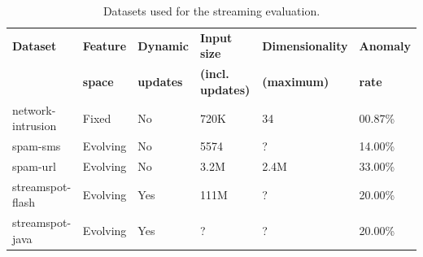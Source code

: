 \documentclass[11pt,onecolumn]{article}
\begin{document}
\begin{table}[ht!]
	\centering
	\begin{tabular}{llllll}
	\toprule
	\textbf{Dataset} & \textbf{Feature} & \textbf{Dynamic} & \textbf{Input size} 		  & \textbf{Dimensionality} & \textbf{Anomaly}\\
									 & \textbf{space}   & \textbf{updates} & \textbf{(incl. updates)} & \textbf{(maximum)} 			& \textbf{rate}\\
	\midrule
	network-intrusion& Fixed 	  		    & No				 & 720K    & 34   & 00.87\%\\
 	spam-sms 			 	 & Evolving 			  & No				 & 5574 	 & ? 	 & 14.00\%\\
 	spam-url 			 	 & Evolving 				& No				 & 3.2M    & 2.4M & 33.00\%\\
	streamspot-flash & Evolving 				& Yes				 & 111M    & ?    & 20.00\%\\
	streamspot-java  & Evolving 				& Yes				 & ?       & ?    & 20.00\%\\
	\bottomrule
	\end{tabular}
	\caption{Datasets used for the streaming evaluation.}
	\label{table:datasets-streaming}
\end{table}
\end{document}
